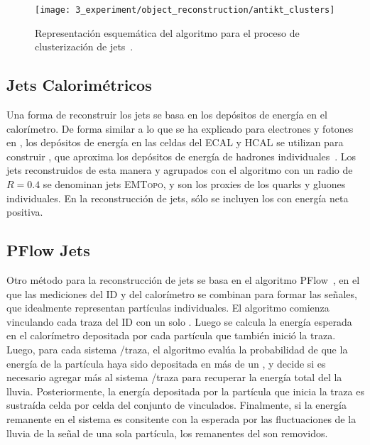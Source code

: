 \begin{figure}[ht!]
    \centering
    \texttt{[image: 3\_experiment/object\_reconstruction/antikt\_clusters]}
    \caption{Representaci\'on esquem\'atica del algoritmo \antikt para el proceso de clusterizaci\'on de jets~\cite{AntiKtAlgorithm}.}
    \label{fig:objects:jets:antikt}
\end{figure}

\subsection{Jets Calorim\'etricos}

Una forma de reconstruir los jets se basa en los depósitos de energía en el calorímetro. De forma similar a lo que se ha explicado para electrones y fotones en \Sect{\ref{subsec:objects:egamma:reco}}, los depósitos de energía en las celdas del \ac{ECAL} y \ac{HCAL} se utilizan para construir \topos, que aproxima los depósitos de energía de hadrones individuales~\cite{ATLAS-TopoClusters-Run1,ATLAS-TopoClusters-Run2}. Los jets reconstruidos de esta manera y agrupados con el algoritmo \antikt con un radio de \(R=0.4\) se denominan jets \textsc{EMTopo}, y son los proxies de los quarks y gluones individuales. En la reconstrucción de jets, sólo se incluyen los \topos con energía neta positiva.

\subsection{\acf{PFlow} Jets}

Otro m\'etodo para la reconstrucci\'on de jets se basa en el algoritmo \ac{PFlow}~\cite{ATLAS-JetPFlow-Performance}, en el que las mediciones del \ac{ID} y del calorímetro se combinan para formar las señales, que idealmente representan partículas individuales. El algoritmo comienza vinculando cada traza del \ac{ID} con un solo \topo. Luego se calcula la energ\'ia esperada en el calor\'imetro depositada por cada part\'icula que tambi\'en inici\'o la traza. Luego, para cada sistema \topo/traza, el algoritmo eval\'ua la probabilidad de que la energ\'ia de la part\'icula haya sido depositada en m\'as de un \topo, y decide si es necesario agregar m\'as \topos al sistema \topo/traza para recuperar la energ\'ia total del la lluvia. Posteriormente, la energ\'ia depositada por la part\'icula que inicia la traza es sustra\'ida celda por celda del conjunto de \topos vinculados. Finalmente, si la energ\'ia remanente en el sistema es consitente con la esperada por las fluctuaciones de la lluvia de la se\~nal de una sola part\'icula, los remanentes del \topo son removidos.

